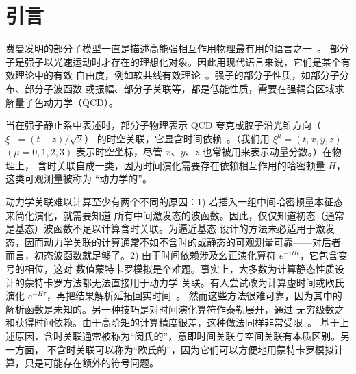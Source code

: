 \begin{abstract}
本文作者所倡导的大动量有效理论（Large-Momentum Effective Theory，简称 LaMET）为在欧氏格点
QCD 理论中模拟部分子物理提供了一条直接途径。近来，文献中对这一理论表现出浓厚兴趣，其中不乏
对其正确性与有效性的质疑。这里我们提供若干讨论，旨在进一步阐明该方法。特别地，我们解释了
为什么在格点 QCD 计算部分子分布矩时它不具有通常的幂次发散问题。LaMET 方法中唯一的幂次发散来自
威尔逊线的自能，而它可以被恰当地因子化出去。我们证明：虽然 Ioffe 时间分布为从同一组格点观测量
中提取部分子分布提供了另一种方式，但要获得精度计算，它同样需要与 LaMET 相同的大动量（或短距离）
极限。在对误差作恰当量化之后，两种提取方法应与同一批格点数据相比较。
\end{abstract}

\section{引言}
\label{intro}

费曼发明的部分子模型一直是描述高能强相互作用物理最有用的语言之一~\cite{Feynman:1969ej}。
部分子是强子以光速运动时才存在的理想化对象。因此用现代语言来说，它们是某个有效理论中的有效
自由度，例如软共线有效理论~\cite{Bauer:2000yr}。强子的部分子性质，如部分子分布、部分子波函数
或振幅、部分子关联等，都是低能性质，需要在强耦合区域求解量子色动力学（QCD）。

当在强子静止系中表述时，部分子物理表示 QCD 夸克或胶子沿光锥方向（$\xi^-=(t-z)/\sqrt{2}$）
的时空关联，它显含时间依赖~\cite{Sterman:1994ce}。（我们用 $\xi^\mu = (t, x, y, z)$
$(\mu=0,1,2,3)$ 表示时空坐标，尽管 $x$、$y$、$z$ 也常被用来表示动量分数。）在物理上，
含时关联自成一类，因为时间演化需要存在依赖相互作用的哈密顿量 $H$，这类可观测量被称为
``动力学的''。

动力学关联难以计算至少有两个不同的原因：1) 若插入一组中间哈密顿量本征态来简化演化，就需要知道
所有中间激发态的波函数。因此，仅仅知道初态（通常是基态）波函数不足以计算含时关联。为逼近基态
设计的方法未必适用于激发态，因而动力学关联的计算通常不如不含时的或静态的可观测量可靠——对后者
而言，初态波函数就足够了。2) 由于时间依赖涉及幺正演化算符 $e^{-iHt}$，它包含变号的相位，这对
数值蒙特卡罗模拟是个难题。事实上，大多数为计算静态性质设计的蒙特卡罗方法都无法直接用于动力学
关联。有人尝试改为计算虚时间或欧氏演化 $e^{-H\tau}$，再把结果解析延拓回实时间~\cite{Nakahara:1999vy,Asakawa:2000tr}。
然而这些方法很难可靠，因为其中的解析函数是未知的。另一种技巧是对时间演化算符作泰勒展开，通过
无穷级数之和获得时间依赖。由于高阶矩的计算精度很差，这种做法同样非常受限~\cite{Hagler:2009ni}。
基于上述原因，含时关联通常被称为``闵氏的''，意即时间关联与空间关联有本质区别。另一方面，
不含时关联可以称为``欧氏的''，因为它们可以方便地用蒙特卡罗模拟计算，只是可能存在额外的符号问题。

